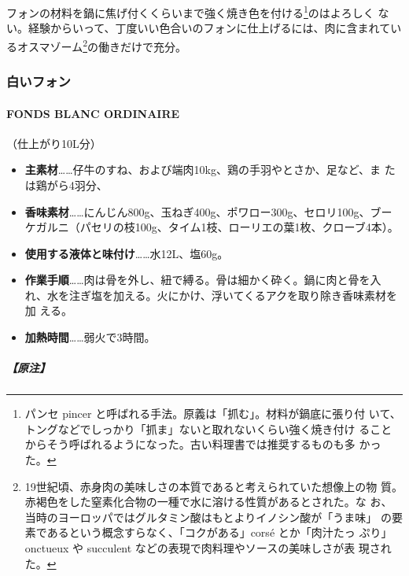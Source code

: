 \documentclass[twoside,12Q,b5j]{escoffierltjsbook}
\newenvironment{recette}{\begin{small}\begin{spacing}{1}\begin{multicols}{2}}{\end{multicols}\end{spacing}\end{small}}
\begin{document}
\begin{recette}
フォンの材料を鍋に焦げ付くくらいまで強く焼き色を付ける\footnote{パンセ
  pincer と呼ばれる手法。原義は「抓む」。材料が鍋底に張り付
  いて、トングなどでしっかり「抓ま」ないと取れないくらい強く焼き付け
  ることからそう呼ばれるようになった。古い料理書では推奨するものも多
  かった。}のはよろしく
ない。経験からいって、丁度いい色合いのフォンに仕上げるには、肉に含まれてい
るオスマゾーム\footnote{19世紀頃、赤身肉の美味しさの本質であると考えられていた想像上の物
  質。赤褐色をした窒素化合物の一種で水に溶ける性質があるとされた。な
  お、当時のヨーロッパではグルタミン酸はもとよりイノシン酸が「うま味」
  の要素であるという概念すらなく、「コクがある」corsé とか「肉汁たっ
  ぷり」onctueux や succulent などの表現で肉料理やソースの美味しさが表
  現された。}の働きだけで充分。

\vspace*{1.7\zw}

\subsubsection{白いフォン}\label{ux767dux3044ux30d5ux30a9ux30f3}

\paragraph{FONDS BLANC ORDINAIRE}\label{fonds-blanc-ordinaire}


（仕上がり10L分）

\begin{itemize}
\item
  \textbf{主素材}\ldots{}\ldots{}仔牛のすね、および端肉10kg、鶏の手羽やとさか、足など、ま
  たは鶏がら4羽分、
\item
  \textbf{香味素材}\ldots{}\ldots{}にんじん800g、玉ねぎ400g、ポワロー300g、セロリ100g、ブー
  ケガルニ（パセリの枝100g、タイム1枝、ローリエの葉1枚、クローブ4本）。
\item
  \textbf{使用する液体と味付け}\ldots{}\ldots{}水12L、塩60g。
\item
  \textbf{作業手順}\ldots{}\ldots{}肉は骨を外し、紐で縛る。骨は細かく砕く。鍋に肉と骨を入
  れ、水を注ぎ塩を加える。火にかけ、浮いてくるアクを取り除き香味素材を加
  える。
\item
  \textbf{加熱時間}\ldots{}\ldots{}弱火で3時間。
\end{itemize}

\subparagraph{【原注】}\label{ux539fux6ce8-1}


\end{recette}
\end{document}

